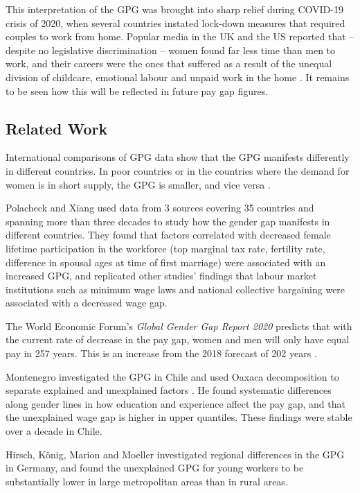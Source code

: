 This interpretation of the GPG was brought into sharp relief during COVID-19 crisis of 2020, when several countries instated lock-down measures that required couples to work from home. Popular media in the UK and the US reported that -- despite no legislative discrimination --  women found far less time than men to work, and their careers were the ones that suffered as a result of the unequal division of childcare, emotional labour and unpaid work in the home \cite{guardian-lockdown-uk, guardian-lockdown-us}. It remains to be seen how this will be reflected in future pay gap figures. 

\subsection{Related Work}
International comparisons of GPG data show that the GPG manifests differently in different countries. In poor countries or in the countries where the demand for women is in short supply, the GPG is smaller, and vice versa \cite{Kahn2013}. 

Polacheck and Xiang \cite{polachek2009} used data from 3 sources covering 35 countries and spanning more than three decades to study how the gender gap manifests in different countries. They found that factors correlated with decreased female lifetime participation in the workforce (top marginal tax rate, fertility rate, difference in spousal ages at time of first marriage) were associated with an increased GPG, and replicated other studies' findings that labour market institutions such as minimum wage laws and national collective bargaining were associated with a decreased wage gap.  

The World Economic Forum’s \emph{Global Gender Gap Report 2020} predicts that with the current rate of decrease in the pay gap, women and men will only have equal pay in 257 years. This is an increase from the 2018 forecast of 202 years  \cite{wef-gpg-report-2020}. 

Montenegro investigated the GPG in Chile and used Oaxaca decomposition to separate explained and unexplained factors \cite{montenegro-chile}. He found systematic differences along gender lines in how education and experience affect the pay gap, and that the unexplained wage gap is higher in upper quantiles. These findings were stable over a decade in Chile. 

Hirsch, König, Marion and Moeller \cite{german-regional} investigated regional differences in the GPG in Germany, and found the unexplained GPG for young workers to be substantially lower in large metropolitan areas than in rural areas. 


